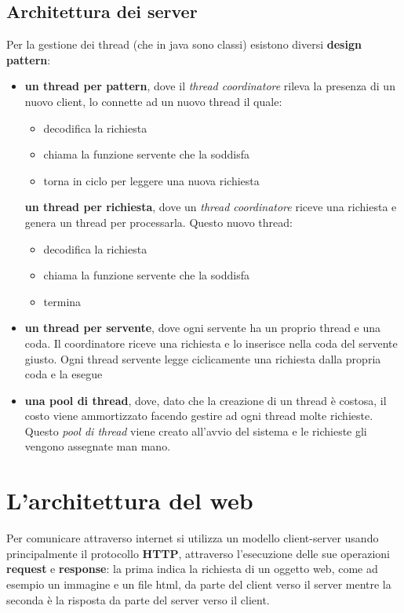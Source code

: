 \documentclass[a4paper,12pt, oneside]{book}
\begin{document}
\subsection{Architettura dei server}
Per la gestione dei thread (che in java sono classi) esistono diversi \textbf{design pattern}:
\begin{itemize}
	\item \textbf{un thread per pattern}, dove il \textit{thread coordinatore} rileva la presenza di un nuovo client, lo connette ad un nuovo thread il quale:
	      \begin{itemize}
		      \item decodifica la richiesta
		      \item chiama la funzione servente che la soddisfa
		      \item torna in ciclo per leggere una nuova richiesta
	      \end{itemize}
	      \textbf{un thread per richiesta}, dove un \textit{thread coordinatore} riceve una richiesta e genera un thread per processarla. Questo nuovo thread:
	      \begin{itemize}
		      \item decodifica la richiesta
		      \item chiama la funzione servente che la soddisfa
		      \item termina
	      \end{itemize}
	\item \textbf{un thread per servente}, dove ogni servente ha un proprio thread e una coda. Il coordinatore riceve una richiesta e lo inserisce nella coda del servente giusto. Ogni thread servente legge ciclicamente una richiesta dalla
	      propria coda e la esegue
	\item \textbf{una pool di thread}, dove, dato che la creazione di un thread è costosa, il costo viene ammortizzato facendo gestire ad ogni thread molte richieste. Questo \textit{pool di thread} viene creato all'avvio del sistema e le richieste gli vengono assegnate man mano.
\end{itemize}

\section{L'architettura del web}
Per comunicare attraverso internet si utilizza un modello client-server usando principalmente 
il protocollo \textbf{HTTP}, attraverso l'esecuzione delle sue operazioni \textbf{request} e \textbf{response}:
la prima indica la richiesta di un oggetto web, come ad esempio un immagine e un file html, 
da parte del client verso il server mentre la seconda è la risposta da parte del server verso il client.
\end{document}
